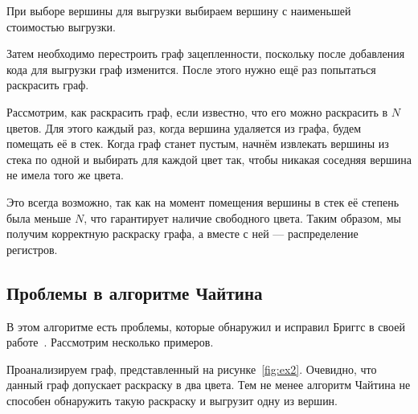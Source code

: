 При выборе вершины для выгрузки выбираем вершину с наименьшей стоимостью выгрузки.

Затем необходимо перестроить граф зацепленности,
поскольку после добавления кода для выгрузки граф изменится.
После этого нужно ещё раз попытаться раскрасить граф.

Рассмотрим, как раскрасить граф, если известно, что его можно раскрасить в $N$ цветов.
Для этого каждый раз, когда вершина удаляется из графа, будем помещать её в стек.
Когда граф станет пустым, начнём извлекать вершины из стека по одной и выбирать для каждой цвет так,
чтобы никакая соседняя вершина не имела того же цвета.

Это всегда возможно, так как на момент помещения вершины в стек её степень была меньше $N$, что гарантирует наличие свободного
цвета. Таким образом, мы получим корректную раскраску графа, а вместе с ней — распределение регистров.

\subsection{Проблемы в алгоритме Чайтина}

В этом алгоритме есть проблемы, которые обнаружил и исправил Бриггс в своей работе~\cite{briggs1994}.
Рассмотрим несколько примеров.

Проанализируем граф, представленный на рисунке~\ref{fig:ex2}. Очевидно, что данный граф допускает раскраску в два цвета.  
Тем не менее алгоритм Чайтина не способен обнаружить такую раскраску и выгрузит одну из вершин.

\begin{figure}[H]
    \centering
\end{figure} %

